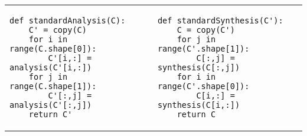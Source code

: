 \begin{adjustbox}{max width=\textwidth ,center}
\begin{tabular}{p{}|p{}}
\begin{verbatim}
def standardAnalysis(C):
    C' = copy(C)
    for i in range(C.shape[0]):
        C'[i,:] = analysis(C'[i,:])
    for j in range(C.shape[1]):
        C'[:,j] = analysis(C'[:,j])
    return C'
\end{verbatim}
&
\begin{verbatim}
def standardSynthesis(C'):
    C = copy(C')
    for j in range(C'.shape[1]):
        C[:,j] = synthesis(C[:,j])
    for i in range(C'.shape[0]):
        C[i,:] = synthesis(C[i,:])
    return C
\end{verbatim}
\\
\end{tabular}
\end{adjustbox}

